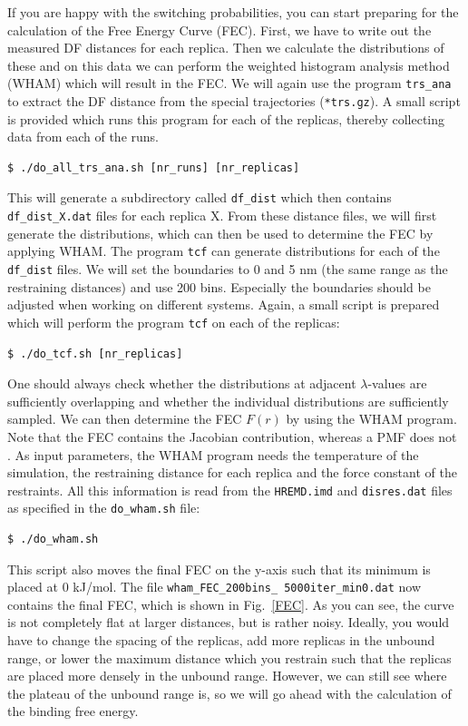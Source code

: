 If you are happy with the switching probabilities, you can start preparing for the calculation of the Free Energy Curve (FEC).
First, we have to write out the measured DF distances for each replica. Then we calculate the distributions of these and on this data we can perform the weighted histogram analysis method (WHAM) which will result in the FEC.
We will again use the program \texttt{trs\_ana} to extract the DF distance from the special trajectories (\texttt{*trs.gz}). 
A small script is provided which runs this program for each of the replicas, thereby collecting data from each of the runs.

\begin{lstlisting}
$ ./do_all_trs_ana.sh [nr_runs] [nr_replicas]
\end{lstlisting}
This will generate a subdirectory called \texttt{df\_dist} which then contains \texttt{df\_dist\_X.dat} files for each replica X. 
From these distance files, we will first generate the distributions, which can then be used to determine the FEC by applying WHAM. 
The program \texttt{tcf} can generate distributions for each of the \texttt{df\_dist} files. 
We will set the boundaries to 0 and 5 nm (the same range as the restraining distances) and use 200 bins. 
Especially the boundaries should be adjusted when working on different systems. 
Again, a small script is prepared which will perform the program \texttt{tcf} on each of the replicas:

\begin{lstlisting}
$ ./do_tcf.sh [nr_replicas]
\end{lstlisting}
One should always check whether the distributions at adjacent $\lambda$-values are sufficiently overlapping and whether the individual distributions are sufficiently sampled.
We can then determine the FEC $F(r)$ by using the WHAM program. 
Note that the FEC contains the Jacobian contribution, whereas a PMF does not \cite{Trzesniak_2007}. 
As input parameters, the WHAM program needs the temperature of the simulation, the restraining distance for each replica and the force constant of the restraints. 
All this information is read from the \texttt{HREMD.imd} and \texttt{disres.dat} files as specified in the \texttt{do\_wham.sh} file:
\begin{lstlisting}
$ ./do_wham.sh
\end{lstlisting}
This script also moves the final FEC on the y-axis such that its minimum is placed at 0 kJ/mol.
The file \texttt{wham\_FEC\_200bins\_ 5000iter\_min0.dat} now contains the final FEC, which is shown in Fig.~\ref{FEC}. As you can see, the curve is not completely flat at larger distances, but is rather noisy. Ideally, you would have to change the spacing of the replicas, add more replicas in the unbound range, or lower the maximum distance which you restrain such that the replicas are placed more densely in the unbound range. 
However, we can still see where the plateau of the unbound range is, so we will go ahead with the calculation of the binding free energy.

